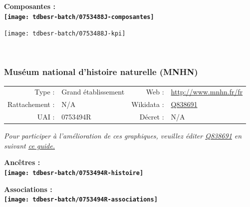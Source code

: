 \documentclass[12pt,french,]{article}
\begin{document}
\hrulefill

\begin{center} \bf Composantes : \\  
\texttt{[image: tdbesr-batch/0753488J-composantes]} \end{center}

\begin{center}\texttt{[image: tdbesr-batch/0753488J-kpi]} \end{center}\checkoddpage

\ifoddpage ~\newpage \fi   

\hypertarget{musuxe9um-national-dhistoire-naturelle-mnhn}{%
\subsubsection{Muséum national d'histoire naturelle
(MNHN)}\label{musuxe9um-national-dhistoire-naturelle-mnhn}}

\begin{tabular*}{\textwidth}{rp{5cm}rl}  
\hline  
Type : & Grand établissement & Web : &\href{http://www.mnhn.fr/fr}{http://www.mnhn.fr/fr} \\  
Rattachement : & N/A & Wikidata : & \href{https://www.wikidata.org/entity/Q838691}{Q838691} \\  
UAI : & 0753494R & Décret : & N/A \\  
\hline  
\end{tabular*}

\textit{\scriptsize Pour participer à l'amélioration de ces graphiques, veuillez éditer  \href{https://www.wikidata.org/entity/Q838691}{Q838691}  en suivant \href{https://github.com/cpesr/wikidataESR/blob/master/Rmd/wikidataESR.md}{ce guide.}}

\vspace{1cm}  
\begin{minipage}[b]{0.50\textwidth}\begin{center} \bf Ancêtres : \\  
\texttt{[image: tdbesr-batch/0753494R-histoire]} \end{center}\end{minipage}\begin{minipage}[b]{0.50\textwidth}\begin{center} \bf Associations : \\  
\texttt{[image: tdbesr-batch/0753494R-associations]} \end{center}\end{minipage}

\hrulefill
\end{document}
